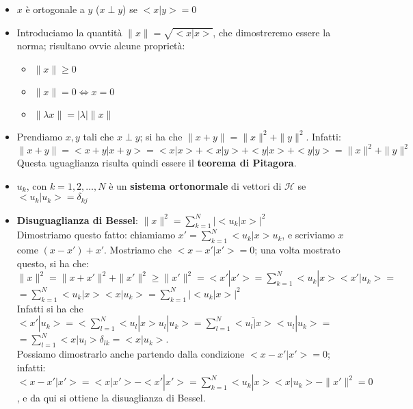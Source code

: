 \begin{itemize}
\item $x$ è ortogonale a $y$ ($x \perp y$) se $<x|y>=0$
\item Introduciamo la quantità $\|x\|=\sqrt{<x|x>}$, che dimostreremo essere la norma; risultano ovvie alcune proprietà:
\begin{itemize}
\item $\|x\| \geq 0$
\item $\|x\| =0 \iff x=0$
\item $\| \lambda x\|=|\lambda| \|x\|$
\end{itemize}
\item Prendiamo $x,y$ tali che $x \perp y$; si ha che $\|x+y\|=\|x\|^2+\|y\|^2$. Infatti: \\$\|x+y\|=<x+y|x+y>=<x|x>+<x|y>+<y|x>+<y|y>=\|x\|^2+\|y\|^2$ \\Questa uguaglianza risulta quindi essere il \textbf{teorema di Pitagora}.
\item $u_k$, con $k=1,2, \dots ,N$ è un \textbf{sistema ortonormale} di vettori di $\mathscr{H}$ se $<u_k|u_k>=\delta_{kj}$
\item \textbf{Disuguaglianza di Bessel}: $\|x\|^2= \sum_{k=1} ^N |<u_k|x>|^2$ \\Dimostriamo questo fatto: chiamiamo $x'=\sum_{k=1} ^N <u_k|x>u_k$, e scriviamo $x$ come $(x-x')+x'$. Mostriamo che $<x-x'|x'>=0$; una volta mostrato questo, si ha che: \\$\|x\|^2 =\|x+x'\|^2 + \|x'\|^2 \geq \|x'\|^2 =<x'|x'>= \sum_{k=1} ^N <u_k|x><x'|u_k>=$ \\$=\sum_{k=1} ^N <u_k|x><x|u_k>=\sum_{k=1} ^N |<u_k|x>|^2$ \\Infatti si ha che $<x'|u_k>=<\sum_{l=1} ^N <u_l|x> u_l|u_k>=\sum_{l=1} ^N \overline{<u_l|x>} <u_l|u_k>=$ \\$=\sum_{l=1} ^N <x|u_l> \delta_{lk}=<x|u_k>$. \\Possiamo dimostrarlo anche partendo dalla condizione $<x-x'|x'> =0$; infatti: \\$<x-x'|x'>=<x|x'>-<x'|x'>=\sum_{k=1} ^N <u_k|x><x|u_k>-\|x'\|^2=0$, e da qui si ottiene la disuaglianza di Bessel.

\end{itemize}
